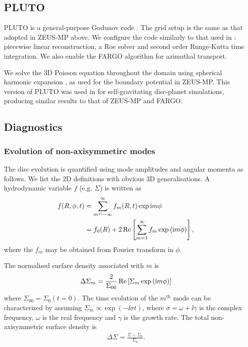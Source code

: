 \subsection{PLUTO} 
PLUTO is a general-purpose Godunov code \citep{mignone07}. The grid
setup is the same as that adopted in ZEUS-MP above. We configure the
code similarly to that used in \cite{lin14}: piecewise linear
reconstruction, a Roe solver and second order Runge-Kutta time
integration. We also enable the FARGO algorithm for azimuthal
transport. 

We solve the 3D Poisson equation throughout the domain using spherical
harmonic expansion \citep{boss80}, as used for the boundary potential
in ZEUS-MP. This version of PLUTO was used in \cite{lin14b} for
self-gravitating disc-planet simulations, producing similar results to
that of ZEUS-MP and FARGO. 


\subsection{Diagnostics}

\subsubsection{Evolution of non-axisymmetirc modes}
The disc evolution is quantified using mode amplitudes and angular
momenta as follows. We list the 2D definitions with obvious 3D generalisations. 
A hydrodynamic variable $f$ (e.g. $\Sigma$) is written as 
\begin{align}
  f(R,\phi,t) &= \sum_{m=-\infty}^{\infty}f_m(R,t)\exp{\mathrm{i}m \phi} \notag\\
  &= f_0(R) + 2 \operatorname{Re}\left[\sum_{m=1}^\infty f_m \exp{(\mathrm{i}m\phi)}\right], 
\end{align}
where the $f_m$ may be obtained from Fourier transform in $\phi$. 

The normalised surface density associated with $m$ is
\begin{align}
  \Delta\Sigma_m = \frac{2}{\Sigma_{00}} \operatorname{Re}\left[\Sigma_m \exp{(\mathrm{i}m\phi)}\right]
\end{align}
where $\Sigma_{00} = \Sigma_0(t=0)$. The time evolution of the
$m^\mathrm{th}$ mode can be characterized by 
assuming $\Sigma_m\propto\exp{(-\ii \sigma t)}$, where
$\sigma = \omega + \ii\gamma$ is the complex frequency, $\omega$ is
the real frequency and $\gamma$ is the growth rate. The total
non-axisymmetric surface density is 
\begin{align}
  \Delta\Sigma = \frac{\Sigma - \Sigma_0}{\Sigma_0}. 
\end{align}


